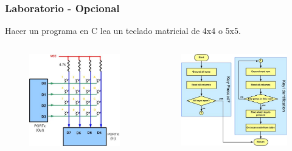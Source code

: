 \documentclass[10.5pt,scale=1.0,t,aspectratio=169,hyperref={pdfpagelabels=false}]{beamer}
\begin{document}
\begin{frame}[fragile]
	\frametitle{Laboratorio - Opcional}
	Hacer un programa en C lea un teclado matricial de 4x4 o 5x5. 
	\begin{columns}
		\begin{figure}
			\centering
			\includegraphics[scale=0.45]{21_Keyboard}
		\end{figure}
		\begin{figure}
			\centering
			\includegraphics[scale=0.45]{22_KeyboardDF}
		\end{figure}
	\end{columns}	
\end{frame}
\frame{
\begin{center}
	\LARGE \textcolor{blue}{GENERAL PURPOSE INPUT-OUTPUT GPIO}
\end{center}

\begin{center}
	\LARGE \textcolor{blue}{GRACIAS}
\end{center}
}

\end{document}
